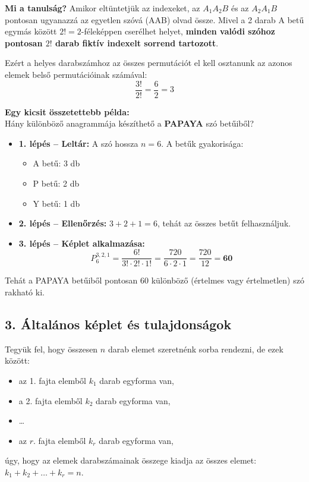 \documentclass[11pt, a4paper]{article}
\begin{document}
\vspace{0.2cm}
\noindent\textbf{Mi a tanulság?}
Amikor eltüntetjük az indexeket, az $A_1 A_2 B$ és az $A_2 A_1 B$ pontosan ugyanazzá az egyetlen szóvá (AAB) olvad össze. Mivel a 2 darab A betű egymás között $2! = 2$-féleképpen cserélhet helyet, \textbf{minden valódi szóhoz pontosan $2!$ darab fiktív indexelt sorrend tartozott}.

Ezért a helyes darabszámhoz az összes permutációt el kell osztanunk az azonos elemek belső permutációinak számával:
\[
\frac{3!}{2!} = \frac{6}{2} = 3
\]


\vspace{0.3cm}
\noindent\textbf{Egy kicsit összetettebb példa:} \\
Hány különböző anagrammája készíthető a \textbf{PAPAYA} szó betűiből?
\begin{itemize}
    \item \textbf{1. lépés – Leltár:} A szó hossza $n = 6$. A betűk gyakorisága:
    \begin{itemize}
        \item A betű: 3 db
        \item P betű: 2 db
        \item Y betű: 1 db
    \end{itemize}
    \item \textbf{2. lépés – Ellenőrzés:} $3 + 2 + 1 = 6$, tehát az összes betűt felhasználjuk.
    \item \textbf{3. lépés – Képlet alkalmazása:}
    \[
    P_6^{3, 2, 1} = \frac{6!}{3! \cdot 2! \cdot 1!} = \frac{720}{6 \cdot 2 \cdot 1} = \frac{720}{12} = \mathbf{60}
    \]
\end{itemize}
Tehát a PAPAYA betűiből pontosan 60 különböző (értelmes vagy értelmetlen) szó rakható ki.


\subsection*{3. Általános képlet és tulajdonságok}
Tegyük fel, hogy összesen $n$ darab elemet szeretnénk sorba rendezni, de ezek között:
\begin{itemize}
    \item az 1. fajta elemből $k_1$ darab egyforma van,
    \item a 2. fajta elemből $k_2$ darab egyforma van,
    \item \dots
    \item az $r$. fajta elemből $k_r$ darab egyforma van,
\end{itemize}
úgy, hogy az elemek darabszámainak összege kiadja az összes elemet: $k_1 + k_2 + \ldots + k_r = n$.
\end{document}
